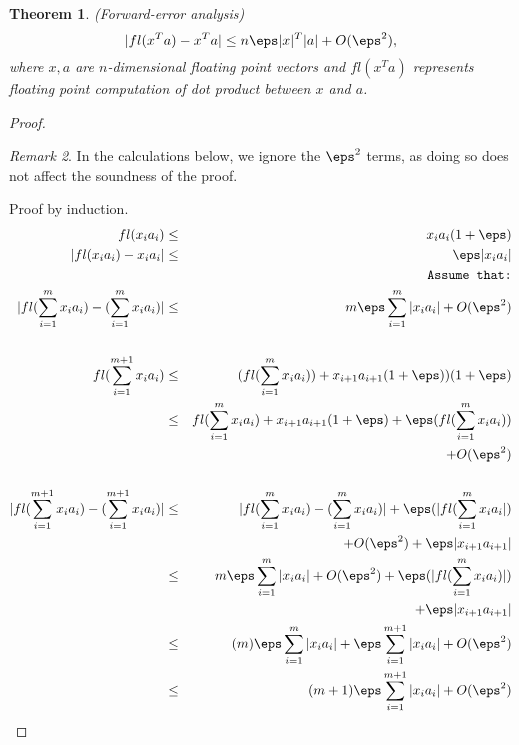 \documentclass[10pt]{amsart}
\newtheorem{thm}{Theorem}[subsection]
\theoremstyle{remark}
\newtheorem{rem}[thm]{Remark}
\begin{document}
\begin{thm}
(Forward-error analysis)
$$|fl(x^Ta)-x^Ta|\leq n\eps|x|^T|a|+O(\eps^2),$$
where $x, a$ are $n$-dimensional floating point vectors and $fl(x^Ta)$ represents floating point computation of dot product between $x$ and $a$.
\end{thm}
\begin{proof}
\begin{rem}
In the calculations below, we ignore the $\eps^{2}$ terms, as doing so does not affect the soundness of the proof.
\end{rem}

Proof by induction.
\begin{eqnarray*}
fl(x_{i}a_{i} ) &\leq& x_{i}a_{i}(1 + \eps)\\
|fl(x_{i}a_{i} ) - x_{i}a_{i}| &\leq& \eps |x_{i}a_{i}| \\
&&\texttt{Assume that:}\\
|fl(\sum_{i=1}^{m} x_{i}a_{i} ) - (\sum_{i=1}^{m}x_{i}a_{i})| &\leq& m\eps\sum_{i=1}^{m} |x_{i}a_{i}|+ O(\eps^{2})\\
\\
fl(\sum_{i=1}^{m+1} x_{i}a_{i}) &\leq& (fl(\sum_{i=1}^{m} x_{i}a_{i})) + x_{i+1}a_{i+1}(1 + \eps))(1+\eps)\\
&\leq& fl(\sum_{i=1}^{m} x_{i}a_{i}) + x_{i+1}a_{i+1}(1+\eps)+\eps(fl(\sum_{i=1}^{m} x_{i}a_{i})) \\
&& + O(\eps^{2})\\
\\
|fl(\sum_{i=1}^{m+1} x_{i}a_{i}) - (\sum_{i=1}^{m+1}x_{i}a_{i})| &\leq& |fl(\sum_{i=1}^{m} x_{i}a_{i}) - (\sum_{i=1}^{m}x_{i}a_{i})|+\eps(|fl(\sum_{i=1}^{m} x_{i}a_{i}|)\\
&& + O(\eps^{2}) + \eps|x_{i+1}a_{i+1}|\\
&\leq& m\eps\sum_{i=1}^{m} |x_{i}a_{i}|+ O(\eps^{2})+\eps(|fl(\sum_{i=1}^{m} x_{i}a_{i})|)\\
&& + \eps|x_{i+1}a_{i+1}|\\
&\leq& (m)\eps\sum_{i=1}^{m} |x_{i}a_{i}|+ \eps\sum_{i=1}^{m+1} |x_{i}a_{i}| + O(\eps^{2})\\
&\leq& (m+1)\eps\sum_{i=1}^{m+1} |x_{i}a_{i}|+ O(\eps^{2})\\
\end{eqnarray*}

\end{proof}
\end{document}

